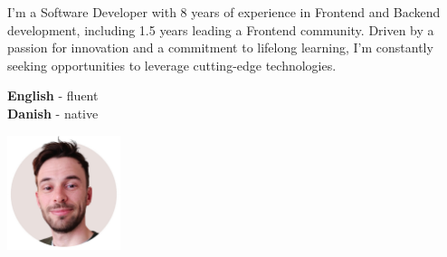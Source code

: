 \documentclass[9pt]{developercv} %
\begin{document}


\begin{minipage}[t]{0.4\textwidth} %
	\vspace{-\baselineskip} %
	
	I’m a Software Developer with 8 years of experience in Frontend and Backend development, including 1.5 years leading a Frontend community. Driven by a passion for innovation and a commitment to lifelong learning, I'm constantly seeking opportunities to leverage cutting-edge technologies.
\end{minipage}
\hfill
\begin{minipage}[t]{0.15\textwidth} %
	\vspace{-\baselineskip} %


	\textbf{English} - fluent\\
	\textbf{Danish} - native
\end{minipage}
\hfill %
\begin{minipage}[t]{0.30\textwidth} %
	\vspace{-15px} %
	\hspace{10px}
	\includegraphics[width=125px]{portrait.jpg}

\end{minipage}
\end{document}

